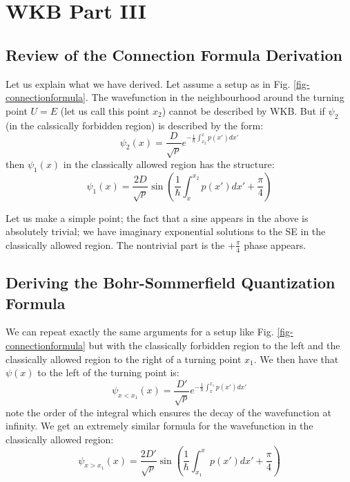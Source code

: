\section{WKB Part III}

\subsection{Review of the Connection Formula Derivation}
Let us explain what we have derived. Let assume a setup as in Fig. \ref{fig-connectionformula}. The wavefunction in the neighbourhood around the turning point $U = E$ (let us call this point $x_2$) cannot be described by WKB. But if $\psi_2$ (in the calssically forbidden region) is described by the form:
\begin{equation}
    \psi_2(x) = \frac{D}{\sqrt{p}}e^{-\frac{1}{\hbar}\int_{x_2}^x p(x')dx'}
\end{equation}
then $\psi_1(x)$ in the classically allowed region has the structure:
\begin{equation}
    \psi_1(x) = \frac{2D}{\sqrt{p}}\sin\left(\frac{1}{\hbar}\int_{x}^{x_2} p(x')dx' + \frac{\pi}{4}\right)
\end{equation}

Let us make a simple point; the fact that a sine appears in the above is absolutely trivial; we have imaginary exponential solutions to the SE in the classically allowed region. The nontrivial part is the $+\frac{\pi}{4}$ phase appears.

\subsection{Deriving the Bohr-Sommerfield Quantization Formula}
We can repeat exactly the same arguments for a setup like Fig. \ref{fig-connectionformula} but with the classically forbidden region to the left and the classically allowed region to the right of a turning point $x_1$. We then have that $\psi(x)$ to the left of the turning point is:
\begin{equation}
    \psi_{x < x_1}(x) = \frac{D'}{\sqrt{p}}e^{-\frac{1}{\hbar}\int_x^{x_1} p(x')dx'}
\end{equation}
note the order of the integral which ensures the decay of the wavefunction at infinity. We get an extremely similar formula for the wavefunction in the classically allowed region:
\begin{equation}
    \psi_{x > x_1}(x) = \frac{2D'}{\sqrt{p}}\sin\left(\frac{1}{\hbar}\int_{x_1}^{x} p(x')dx' + \frac{\pi}{4}\right)
\end{equation}

